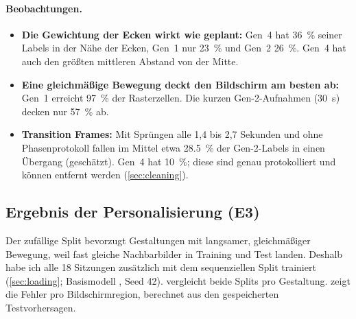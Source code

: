 \paragraph{Beobachtungen.}
\begin{itemize}[nosep]
  \item \textbf{Die Gewichtung der Ecken wirkt wie geplant:} Gen~4 hat
        \SI{36}{\percent} seiner Labels in der Nähe der Ecken, Gen~1 nur
        \SI{23}{\percent} und Gen~2 \SI{26}{\percent}. Gen~4 hat auch den
        größten mittleren Abstand von der Mitte.
  \item \textbf{Eine gleichmäßige Bewegung deckt den Bildschirm am besten
        ab:} Gen~1 erreicht \SI{97}{\percent} der Rasterzellen. Die kurzen
        Gen-2-Aufnahmen (\SI{30}{\second}) decken nur \SI{57}{\percent} ab.
  \item \textbf{Transition Frames:} Mit Sprüngen alle 1,4 bis 2,7 Sekunden und
        ohne Phasenprotokoll fallen im Mittel etwa \SI{28,5}{\percent} der Gen-2-Labels in einen
        Übergang (geschätzt). Gen~4 hat \SI{10}{\percent}; diese sind genau protokolliert
        und können entfernt werden (\cref{sec:cleaning}).
\end{itemize}

\subsection{Ergebnis der Personalisierung (E3)}
\label{sec:design_performance}

Der zufällige Split bevorzugt Gestaltungen mit langsamer, gleichmäßiger
Bewegung, weil fast gleiche Nachbarbilder in Training und Test landen. Deshalb
habe ich alle 18 Sitzungen zusätzlich mit dem sequenziellen Split trainiert
(\cref{sec:loading}; Basismodell , Seed 42).
 vergleicht beide Splits pro Gestaltung.
 zeigt die Fehler pro Bildschirmregion, berechnet aus
den gespeicherten Testvorhersagen.

